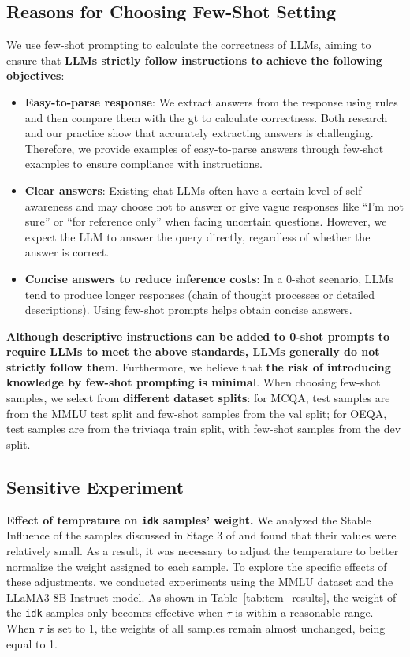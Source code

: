 \subsection{Reasons for Choosing Few-Shot Setting}
\label{A5}
We use few-shot prompting to calculate the correctness of LLMs, aiming to ensure that \textbf{LLMs strictly follow instructions to achieve the following objectives}:
\begin{itemize}[leftmargin=*]
    \item \textbf{Easy-to-parse response}: We extract answers from the response using rules and then compare them with the gt to calculate correctness. Both research~\cite{xfinder} and our practice show that accurately extracting answers is challenging. Therefore, we provide examples of easy-to-parse answers through few-shot examples to ensure compliance with instructions.
    \item \textbf{Clear answers}: Existing chat LLMs often have a certain level of self-awareness and may choose not to answer or give vague responses like ``I'm not sure'' or ``for reference only'' when facing uncertain questions. However, we expect the LLM to answer the query directly, regardless of whether the answer is correct.
    \item \textbf{Concise answers to reduce inference costs}: In a 0-shot scenario, LLMs tend to produce longer responses (chain of thought processes or detailed descriptions). Using few-shot prompts helps obtain concise answers.
\end{itemize}
\textbf{Although descriptive instructions can be added to 0-shot prompts to require LLMs to meet the above standards, LLMs generally do not strictly follow them.} Furthermore, we believe that \textbf{the risk of introducing knowledge by few-shot prompting is minimal}. When choosing few-shot samples, we select from \textbf{different dataset splits}: for MCQA, test samples are from the MMLU test split and few-shot samples from the val split; for OEQA, test samples are from the triviaqa train split, with few-shot samples from the dev split.

\subsection{Sensitive Experiment}
\label{A6}
\textbf{Effect of temprature on \texttt{idk} samples' weight.}
We analyzed the Stable Influence of the samples discussed in Stage 3 of \M and found that their values were relatively small. As a result, it was necessary to adjust the temperature to better normalize the weight assigned to each sample. To explore the specific effects of these adjustments, we conducted experiments using the MMLU dataset and the LLaMA3-8B-Instruct model. As shown in Table~\ref{tab:tem_results}, the weight of the \texttt{idk} samples only becomes effective when \( \tau \) is within a reasonable range. When \( \tau \) is set to 1, the weights of all samples remain almost unchanged, being equal to 1.

